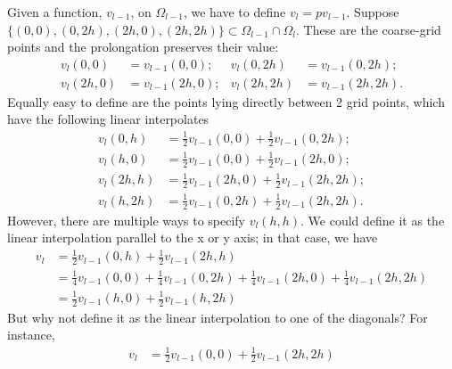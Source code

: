 \documentclass[a4paper,10pt,oneside]{book}
\theoremstyle{plain}%
\theoremstyle{definition}
\theoremstyle{remark}
\begin{document}
Given a function, $v_{l-1}$, on $\Omega_{l-1}$, we have to define
$v_l=pv_{l-1}$. Suppose
$\{(0,0),(0,2h),(2h,0),(2h,2h)\}\subset\Omega_{l-1}\cap\Omega_l$. These are the
coarse-grid points and the prolongation preserves their value:
\begin{align}
 v_l(0,0)&=v_{l-1}(0,0);&v_l(0,2h)&=v_{l-1}(0,2h);\\
 v_l(2h,0)&=v_{l-1}(2h,0);&v_l(2h,2h)&=v_{l-1}(2h,2h).
\end{align}
Equally easy to define are the points lying directly between 2 grid points,
which have the following linear interpolates
\begin{align}
 v_l(0,h)&=\frac{1}{2}v_{l-1}(0,0)+\frac{1}{2}v_{l-1}(0,2h);\\
 v_l(h,0)&=\frac{1}{2}v_{l-1}(0,0)+\frac{1}{2}v_{l-1}(2h,0);\\
 v_l(2h,h)&=\frac{1}{2}v_{l-1}(2h,0)+\frac{1}{2}v_{l-1}(2h,2h);\\
 v_l(h,2h)&=\frac{1}{2}v_{l-1}(0,2h)+\frac{1}{2}v_{l-1}(2h,2h).
\end{align}
However, there are multiple ways to specify $v_l(h,h)$. We could define it as
the linear interpolation parallel to the x or y axis; in that case, we have
\begin{align}
 v_l&=\frac{1}{2}v_{l-1}(0,h)+\frac{1}{2}v_{l-1}(2h,h)\\
    &=\frac{1}{4}v_{l-1}(0,0)+\frac{1}{4}v_{l-1}(0,2h)
     +\frac{1}{4}v_{l-1}(2h,0)+\frac{1}{4}v_{l-1}(2h,2h)\\
    &=\frac{1}{2}v_{l-1}(h,0)+\frac{1}{2}v_{l-1}(h,2h)
\end{align}
But why not define it as the linear interpolation to one of the diagonals? For
instance,
\begin{align}
 v_l&=\frac{1}{2}v_{l-1}(0,0)+\frac{1}{2}v_{l-1}(2h,2h)
\end{align}
\end{document}
